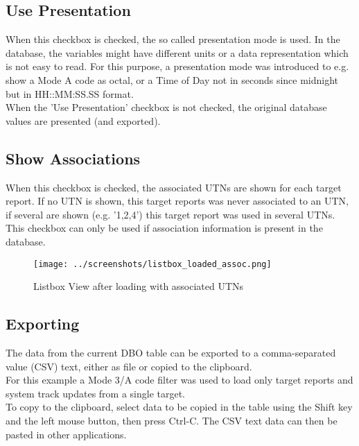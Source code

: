 \subsection{Use Presentation}
When this checkbox is checked, the so called presentation mode is used. In the database, the variables might have different units or a data representation which is not easy to read. For this purpose, a presentation mode was introduced to e.g. show a Mode A code as octal, or a Time of Day not in seconds since midnight but in HH::MM:SS.SS format. \\

When the 'Use Presentation' checkbox is not checked, the original database values are presented (and exported).

\subsection{Show Associations}
When this checkbox is checked, the associated UTNs are shown for each target report. If no UTN is shown, this target reports was never associated to an UTN, if several are shown (e.g. '1,2,4') this target report was used in several UTNs. \\

This checkbox can only be used if association information is present in the database.

\begin{figure}[H]
    \hspace*{-2cm}
    \texttt{[image: ../screenshots/listbox\_loaded\_assoc.png]}
  \caption{Listbox View after loading with associated UTNs}
\end{figure}


\subsection{Exporting}
\label{sec:exporting}

The data from the current DBO table can be exported to a comma-separated value (CSV) text, either as file or copied to the clipboard. \\

For this example a Mode 3/A code filter was used to load only target reports and system track updates from a single target. \\

To copy to the clipboard, select data to be copied in the table using the Shift key and the left mouse button, then press Ctrl-C. The CSV text data can then be pasted in other applications. \\

